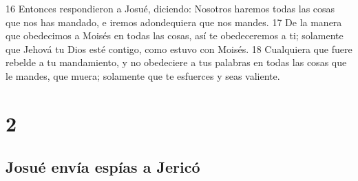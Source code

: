 16 Entonces respondieron a Josué, diciendo: Nosotros haremos todas las cosas que nos has mandado, e iremos adondequiera que nos mandes.
17 De la manera que obedecimos a Moisés en todas las cosas, así te obedeceremos a ti; solamente que Jehová tu Dios esté contigo, como estuvo con Moisés.
18 Cualquiera que fuere rebelde a tu mandamiento, y no obedeciere a tus palabras en todas las cosas que le mandes, que muera; solamente que te esfuerces y seas valiente.

\chapter{2}

\section*{Josué envía espías a Jericó}


